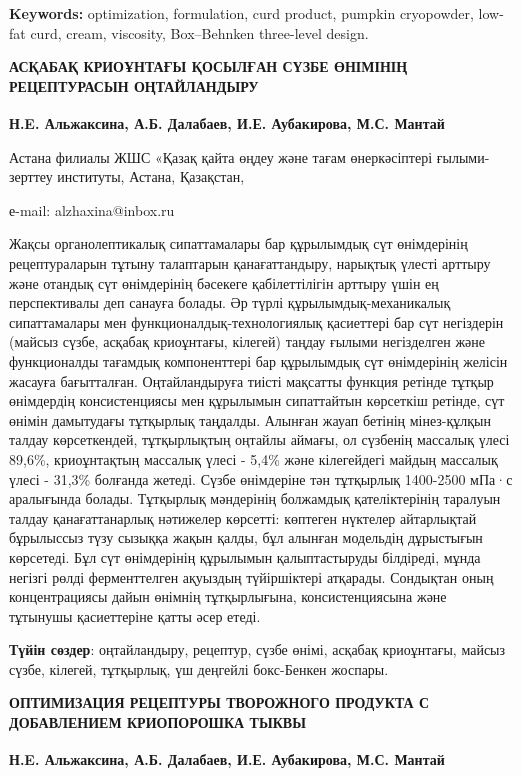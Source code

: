 {\bfseries Keywords:} optimization, formulation, curd product, pumpkin
cryopowder, low-fat curd, cream, visco\-sity, Box--Behnken three-level
design.

\begin{articleheader}
{\bfseries АСҚАБАҚ КРИОҰНТАҒЫ ҚОСЫЛҒАН СҮЗБЕ ӨНІМІНІҢ РЕЦЕПТУРАСЫН ОҢТАЙЛАНДЫРУ}

{\bfseries
Н.E. Альжаксина\textsuperscript{\envelope },
А.Б. Далабаев,
И.Е. Аубакирова,
М.С. Мантай
}
\end{articleheader}

\begin{affiliation}
Астана филиалы ЖШС «Қазақ қайта өңдеу және тағам өнеркәсіптері ғылыми-зерттеу институты, Астана, Қазақстан,

е-mail: alzhaxina@inbox.ru
\end{affiliation}

Жақсы органолептикалық сипаттамалары бар құрылымдық сүт өнімдерінің
рецептураларын тұтыну талаптарын қанағаттандыру, нарықтық үлесті арттыру
және отандық сүт өнімдерінің бәсекеге қабілеттілігін арттыру үшін ең
перспективалы деп санауға болады. Әр түрлі құрылымдық-механикалық
сипаттамалары мен функционалдық-технологиялық қасиеттері бар сүт
негіздерін (майсыз сүзбе, асқабақ криоұнтағы, кілегей) таңдау ғылыми
негізделген және функционалды тағамдық компоненттері бар құрылымдық сүт
өнімдерінің желісін жасауға бағытталған. Оңтайландыруға тиісті мақсатты
функция ретінде тұтқыр өнімдердің консистенциясы мен құрылымын
сипаттайтын көрсеткіш ретінде, сүт өнімін дамытудағы тұтқырлық таңдалды.
Алынған жауап бетінің мінез-құлқын талдау көрсеткендей, тұтқырлықтың
оңтайлы аймағы, ол сүзбенің массалық үлесі 89,6\%, криоұнтақтың массалық
үлесі - 5,4\% және кілегейдегі майдың массалық үлесі - 31,3\% болғанда
жетеді. Сүзбе өнімдеріне тән тұтқырлық 1400-2500 мПа·с аралығында
болады. Тұтқырлық мәндерінің болжамдық қателіктерінің таралуын талдау
қанағаттанарлық нәтижелер көрсетті: көптеген нүктелер айтарлықтай
бұрылыссыз түзу сызыққа жақын қалды, бұл алынған модельдің дұрыстығын
көрсетеді. Бұл сүт өнімдерінің құрылымын қалыптастыруды білдіреді, мұнда
негізгі рөлді ферменттелген ақуыздың түйіршіктері атқарады. Сондықтан
оның концентрациясы дайын өнімнің тұтқырлығына, консистенциясына және
тұтынушы қасиеттеріне қатты әсер етеді.

{\bfseries Түйін сөздер}: оңтайландыру, рецептур, сүзбе өнімі, асқабақ
криоұнтағы, майсыз сүзбе, кілегей, тұтқырлық, үш деңгейлі бокс-Бенкен
жоспары.

\begin{articleheader}
{\bfseries ОПТИМИЗАЦИЯ РЕЦЕПТУРЫ ТВОРОЖНОГО ПРОДУКТА С ДОБАВЛЕНИЕМ КРИОПОРОШКА ТЫКВЫ}

{\bfseries
Н.E. Альжаксина\textsuperscript{\envelope },
А.Б. Далабаев,
И.Е. Аубакирова,
М.С. Мантай
}
\end{articleheader}

